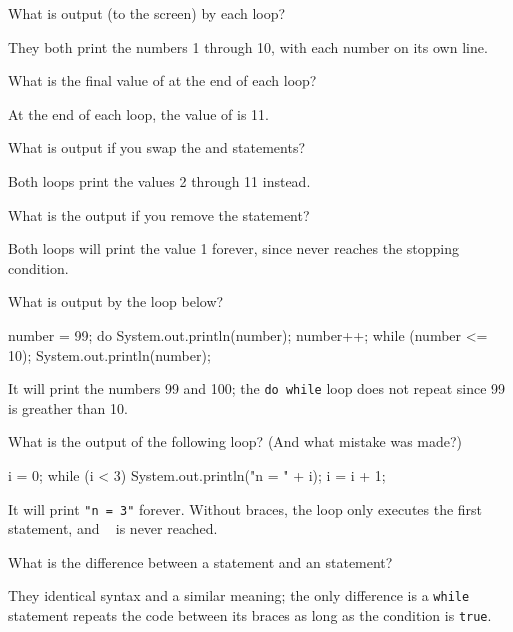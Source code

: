 \Q \label{output}
What is output (to the screen) by each loop?

\begin{answer}
They both print the numbers 1 through 10, with each number on its own line.
\end{answer}


\Q \label{value}
What is the final value of  at the end of each loop?

\begin{answer}
At the end of each loop, the value of  is 11.
\end{answer}


\Q What is output if you swap the  and  statements?

\begin{answer}
Both loops print the values 2 through 11 instead.
\end{answer}


\Q What is the output if you remove the  statement?

\begin{answer}
Both loops will print the value 1 forever, since  never reaches the stopping condition.
\end{answer}


\Q \label{do99}
What is output by the loop below?

\begin{minipage}{0.49\textwidth}
\begin{javalst}
    number = 99;
    do {
        System.out.println(number);
        number++;
    } while (number <= 10);
    System.out.println(number);
\end{javalst}
\end{minipage}
\hfill
\begin{minipage}{0.49\textwidth}
\begin{answer}
It will print the numbers 99 and 100; the \texttt{do while} loop does not repeat since 99 is greather than 10.
\end{answer}
\end{minipage}
\vspace{1ex}


\Q What is the output of the following loop? (And what mistake was made?)

\begin{minipage}{0.49\textwidth}
\begin{javalst}
    i = 0;
    while (i < 3) 
        System.out.println("n = " + i);
        i = i + 1;
\end{javalst}
\end{minipage}
\hfill
\begin{minipage}{0.49\textwidth}
\begin{answer}
It will print \texttt{"n = 3"} forever. Without braces, the loop only executes the first statement, and ~ is never reached.
\end{answer}
\end{minipage}
\vspace{1ex}


\Q What is the difference between a  statement and an  statement?

\begin{answer}
They identical syntax and a similar meaning; the only difference is a \texttt{while} statement repeats the code between its braces as long as the condition is \texttt{true}.
\end{answer}
